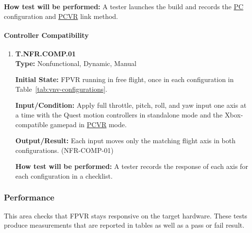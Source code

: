 \documentclass[12pt, titlepage]{article}
\begin{document}
{\begin{enumerate}
\textbf{How test will be performed:} A tester launches the build and records the \hyperlink{abbr:PC}{PC}
configuration and \hyperlink{abbr:PCVR}{PCVR} link method.

\end{enumerate}

\paragraph{Controller Compatibility}

\begin{enumerate}

\item{\hypertarget{test-nfr-comp-01}{}\textbf{T.NFR.COMP.01}\\}
\textbf{Type:} Nonfunctional, Dynamic, Manual

\textbf{Initial State:} FPVR running in free flight, once in each configuration in
Table~\ref{tab:vnv-configurations}.

\textbf{Input/Condition:} Apply full throttle, pitch, roll, and yaw input one axis at a
time with the Quest motion controllers in standalone mode and the Xbox-compatible
gamepad in \hyperlink{abbr:PCVR}{PCVR} mode.

\textbf{Output/Result:} Each input moves only the matching flight axis in both
configurations. (\mbox{NFR-COMP-01})

\textbf{How test will be performed:} A tester records the response of each axis for each
configuration in a checklist.

\end{enumerate}
\par}

\subsubsection{Performance}

This area checks that FPVR stays responsive on the target hardware. These tests produce
measurements that are reported in tables as well as a pass or fail result.
\end{document}
